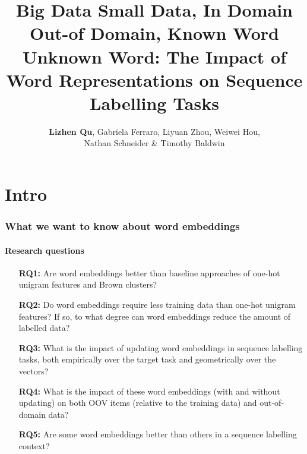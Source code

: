 \documentclass{beamer}
\title[Word Representations on Sequence Labelling Tasks] %
{Big Data Small Data, In Domain Out-of Domain, Known Word Unknown
  Word: The Impact of Word Representations on Sequence Labelling Tasks}
\author[Lizhen Qu et al.]{\textbf{Lizhen Qu}, Gabriela Ferraro, Liyuan Zhou, Weiwei Hou, \\
Nathan Schneider \& Timothy Baldwin }
\begin{document}
{
\begin{frame}
  \titlepage
\end{frame}
}





\section{Intro}
\label{sec:intro}



\begin{frame}
\frametitle{What we want to know about word embeddings}
  \framesubtitle{Research questions}

\begin{itemize}
\item[\bf RQ1:] Are word embeddings better than baseline approaches of one-hot unigram features and Brown clusters?
\item[\bf RQ2:] Do word embeddings require less training data than one-hot unigram features? If so, to what degree can word embeddings reduce the amount of labelled data?
\item[\bf RQ3:] What is the impact of updating word embeddings in sequence
  labelling tasks, both empirically over the target task and
  geometrically over the vectors?
\item[\bf RQ4:] What is the impact of these word embeddings (with and without
  updating) on both OOV items (relative to the training data) and
  out-of-domain data?
\item[\bf RQ5:] Are some word embeddings better than others in a sequence labelling context?
\end{itemize}
\end{frame}
\end{document}
